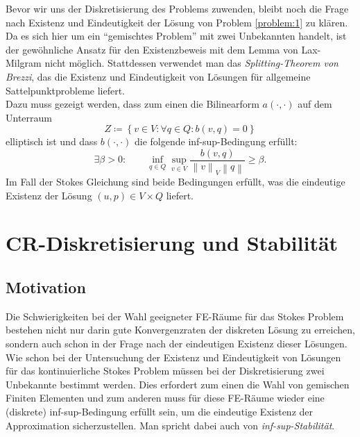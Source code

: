 \documentclass[a4paper]{scrartcl}
\newcommand{\vnorm}[1]{\left\lVert#1\right\rVert_V}
\newcommand{\norm}[1]{\left\lVert#1\right\rVert}
\newcommand{\set}[1]{\left\{#1\right\}}
\newcommand{\black}{\color{black}}
\newcommand{\blue}{\color{blue}}
\theoremstyle{plain}
\theoremstyle{definition}
\theoremstyle{remark}
\begin{document}
\blue
\noindent Bevor wir uns der Diskretisierung des Problems zuwenden, bleibt
noch die Frage nach Existenz und Eindeutigkeit der Lösung von
Problem \ref{problem:1} zu klären. \\

\noindent Da es sich hier um ein ``gemischtes Problem'' mit zwei
Unbekannten handelt, ist der gewöhnliche Ansatz für den Existenzbeweis
mit dem Lemma von Lax-Milgram nicht möglich. Stattdessen verwendet man das
\emph{Splitting-Theorem von Brezzi}, das  die Existenz und Eindeutigkeit von
Lösungen für allgemeine Sattelpunktprobleme liefert. \\
\black
Dazu muss gezeigt werden, dass zum einen die Bilinearform \(a(\cdot,
\cdot)\) auf dem Unterraum 
\begin{equation}
  \label{eq:29}
  Z \coloneqq \set{v \in V: \forall q \in Q: b(v,q) = 0}
\end{equation}
elliptisch ist und dass \(b(\cdot, \cdot)\) die folgende
inf-sup-Bedingung erfüllt: 
\begin{equation}
  \label{eq:30}
  \exists \beta > 0:\qquad \inf_{q\in Q} \sup_{v \in V} \frac{b(v,q)}{\vnorm{v}\norm{q}} \geq \beta. 
\end{equation}
Im Fall der Stokes Gleichung sind beide Bedingungen erfüllt, was die
eindeutige Existenz der Lösung \((u,p) \in V\times Q\) liefert. 



\section{CR-Diskretisierung und Stabilität}
\label{sec:cr-diskr-und}

\subsection{Motivation}
\label{sec:motivation}

\blue
Die Schwierigkeiten bei der Wahl geeigneter FE-Räume für das Stokes
Problem bestehen nicht nur darin gute Konvergenzraten der diskreten
Lösung zu erreichen, sondern auch schon in der Frage nach der
eindeutigen Existenz dieser Lösungen. \\

\noindent Wie schon bei der Untersuchung der Existenz und
Eindeutigkeit von Lösungen für das kontinuierliche Stokes Problem müssen
bei der Diskretisierung zwei Unbekannte bestimmt werden. Dies
erfordert zum einen die Wahl von gemischen Finiten Elementen und zum
anderen muss für diese FE-Räume wieder eine (diskrete)
inf-sup-Bedingung erfüllt sein, um die eindeutige Existenz der
Approximation sicherzustellen. Man spricht dabei auch von
\emph{inf-sup-Stabilität}. \\ 
\end{document}
